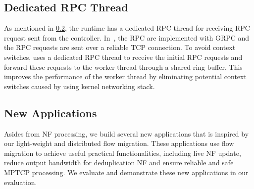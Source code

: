 \subsection{Dedicated RPC Thread}
As mentioned in \ref{}, the runtime has a dedicated RPC thread for receiving RPC request sent from the controller. In~\nfactor, the RPC are implemented with GRPC \cite{grpc} and the RPC requests are sent over a reliable TCP connection. To avoid context switches, \nfactor uses a dedicated RPC thread to receive the initial RPC requests and forward these requests to the worker thread through a shared ring buffer. This improves the performance of the worker thread by eliminating potential context switches caused by using kernel networking stack.

\subsection{New Applications}
Asides from NF processing, we build several new applications that is inspired by our light-weight and distributed flow migration. These applications use flow migration to achieve useful practical functionalities, including live NF update, reduce output bandwidth for deduplication NF and ensure reliable and safe MPTCP processing. We evaluate and demonstrate these new applications in our evaluation.




